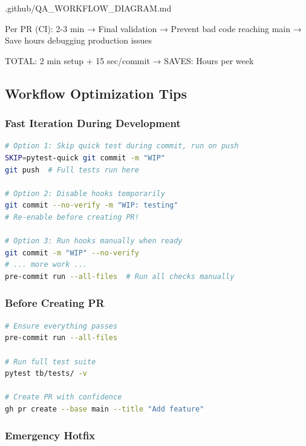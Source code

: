 \begin{relocated}{.github/QA_WORKFLOW_DIAGRAM.md}
\begin{textblock}
Per PR (CI): 2-3 min               → Final validation
                                   → Prevent bad code reaching main
                                   → Save hours debugging production issues

TOTAL: 2 min setup + 15 sec/commit → SAVES: Hours per week
\end{textblock}

\subsection{Workflow Optimization Tips}\label{um:flow:qa-workflow-diagram:workflow-optimization-tips}

\subsubsection{Fast Iteration During Development}\label{um:flow:qa-workflow-diagram:fast-iteration-during-development}

\begin{lstlisting}[language=bash]
# Option 1: Skip quick test during commit, run on push
SKIP=pytest-quick git commit -m "WIP"
git push  # Full tests run here

# Option 2: Disable hooks temporarily
git commit --no-verify -m "WIP: testing"
# Re-enable before creating PR!

# Option 3: Run hooks manually when ready
git commit -m "WIP" --no-verify
# ... more work ...
pre-commit run --all-files  # Run all checks manually
\end{lstlisting}

\subsubsection{Before Creating PR}\label{um:flow:qa-workflow-diagram:before-creating-pr}

\begin{lstlisting}[language=bash]
# Ensure everything passes
pre-commit run --all-files

# Run full test suite
pytest tb/tests/ -v

# Create PR with confidence
gh pr create --base main --title "Add feature"
\end{lstlisting}

\subsubsection{Emergency Hotfix}\label{um:flow:qa-workflow-diagram:emergency-hotfix}


\end{relocated}

